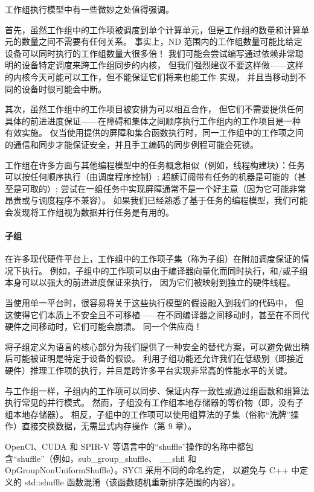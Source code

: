 工作组执行模型中有一些微妙之处值得强调。

首先，虽然工作组中的工作项被调度到单个计算单元，但是工作组的数量和计算单元的数量之间不需要有任何关系。 
事实上，ND 范围内的工作组数量可能比给定设备可以同时执行的工作组数量大很多倍！ 
我们可能会尝试编写通过依赖非常聪明的设备特定调度来跨工作组同步的内核，
但我们强烈建议不要这样做——这样的内核今天可能可以工作，但不能保证它们将来也能工作 实现，
并且当移动到不同的设备时很可能会中断。

其次，虽然工作组中的工作项目被安排为可以相互合作，
但它们不需要提供任何具体的前进进度保证——在障碍和集体之间顺序执行工作组内的工作项目是一种 有效实施。 
仅当使用提供的屏障和集合函数执行时，同一工作组中的工作项之间的通信和同步才能保证安全，并且手工编码的同步例程可能会死锁。

\begin{remark}[在工作组中思考]
	工作组在许多方面与其他编程模型中的任务概念相似（例如，线程构建块）：任务可以按任何顺序执行（由调度程序控制）;
	超额订阅带有任务的机器是可能的（甚至是可取的）;
	尝试在一组任务中实现屏障通常不是一个好主意（因为它可能非常昂贵或与调度程序不兼容）。
	如果我们已经熟悉了基于任务的编程模型，我们可能会发现将工作组视为数据并行任务是有用的。
\end{remark}

\paragraph{子组}

在许多现代硬件平台上，工作组中的工作项子集（称为子组）在附加调度保证的情况下执行。 
例如，子组中的工作项可以由于编译器向量化而同时执行，和/或子组本身可以以强大的前进进度保证来执行，
因为它们被映射到独立的硬件线程。

当使用单一平台时，很容易将关于这些执行模型的假设融入到我们的代码中，
但这使得它们本质上不安全且不可移植——在不同编译器之间移动时，甚至在不同代硬件之间移动时，它们可能会崩溃。 同一个供应商！

将子组定义为语言的核心部分为我们提供了一种安全的替代方案，可以避免做出稍后可能被证明是特定于设备的假设。 
利用子组功能还允许我们在低级别（即接近硬件）推理工作项的执行，并且是跨许多平台实现非常高的性能水平的关键。

与工作组一样，子组内的工作项可以同步、保证内存一致性或通过组函数和组算法执行常见的并行模式。 
然而，子组没有工作组本地存储器的等价物（即，没有子组本地存储器）。 
相反，子组中的工作项可以使用组算法的子集（俗称“洗牌”操作）直接交换数据，无需显式内存操作（第 9 章）。

\begin{remark}
	OpenCl、CUDA 和 SPIR-V 等语言中的“shuffle”操作的名称中都包含“shuffle”（例如，sub\_group\_shuffle、
	\_\_shfl 和 OpGroupNonUniformShuffle）。SYCl 采用不同的命名约定，
	以避免与 C++ 中定义的 std::shuffle 函数混淆（该函数随机重新排序范围的内容）。
\end{remark}

